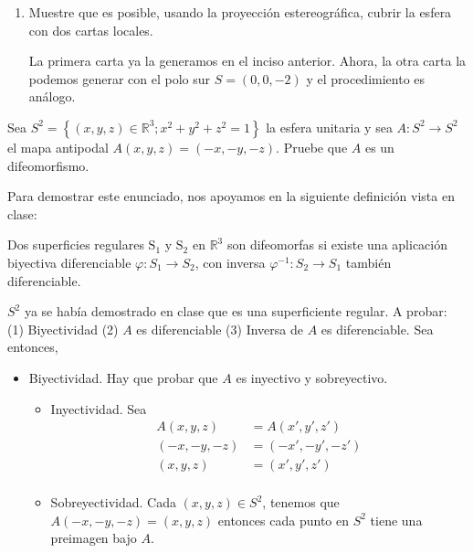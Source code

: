 \begin{problema}
\begin{enumerate}
\begin{sol}
\end{sol}

        \item Muestre que es posible, usando la proyección estereográfica, cubrir la esfera con dos cartas locales.
        \begin{sol}
            La primera carta ya la generamos en el inciso anterior. Ahora, la otra carta la podemos generar con el polo sur $S=(0,0,-2)$ y el procedimiento es análogo. 
        \end{sol}
    \end{enumerate}

\end{problema}

\begin{problema}
    Sea $S^2=\left\{(x, y, z) \in \mathbb{R}^3 ; x^2+y^2+z^2=1\right\}$ la esfera unitaria y sea $A: S^2 \rightarrow S^2$ el mapa antipodal $A(x, y, z)=(-x,-y,-z)$. Pruebe que $A$ es un difeomorfismo.
    \begin{dem}
        Para demostrar este enunciado, nos apoyamos en la siguiente definición vista en clase:
        \begin{cajita}
Dos superficies regulares $\mathrm{S}_1$ y $\mathrm{S}_2$ en $\mathbb{R}^3$ son difeomorfas si existe una aplicación biyectiva diferenciable $\varphi: S_1 \rightarrow S_2$, con inversa $\varphi^{-1}: S_2 \rightarrow S_1$ también diferenciable.
        \end{cajita}
        $S^2$ ya se había demostrado en clase que es una superficiente regular. A probar: (1) Biyectividad (2) $A$ es diferenciable (3) Inversa de $A$ es diferenciable. 
        Sea entonces, 
        \begin{itemize}
            \item Biyectividad. Hay que probar que $A$ es inyectivo y sobreyectivo. \begin{itemize}
                \item Inyectividad. Sea
                \begin{align*}
                    A(x,y,z) &= A(x',y',z')\\
                    (-x, -y, -z) &= (-x', -y', -z')\\
                    (x, y, z) &= (x', y', z')\\
                \end{align*}
                \item Sobreyectividad. Cada $(x,y,z)\in S^2$, tenemos que $A(-x,-y,-z)= (x,y,z)$ entonces cada punto en $S^2$ tiene una preimagen bajo $A$. 

\end{itemize}
\end{itemize}
\end{dem}
\end{problema}
